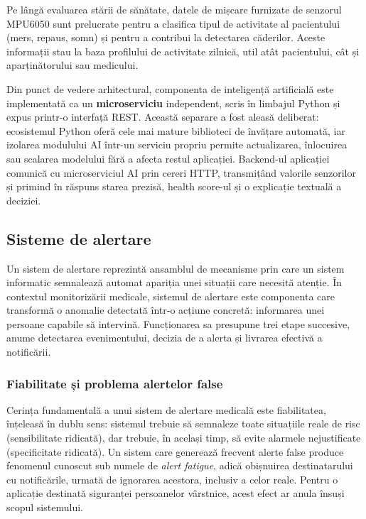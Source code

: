 \documentclass[12pt,a4paper]{article}
\begin{document}
Pe lângă evaluarea stării de sănătate, datele de mișcare furnizate de senzorul MPU6050 sunt prelucrate pentru a clasifica tipul de activitate al pacientului (mers, repaus, somn) și pentru a contribui la detectarea căderilor. Aceste informații stau la baza profilului de activitate zilnică, util atât pacientului, cât și aparținătorului sau medicului.

Din punct de vedere arhitectural, componenta de inteligență artificială este implementată ca un \textbf{microserviciu} independent, scris în limbajul Python și expus printr-o interfață REST. Această separare a fost aleasă deliberat: ecosistemul Python oferă cele mai mature biblioteci de învățare automată, iar izolarea modulului AI într-un serviciu propriu permite actualizarea, înlocuirea sau scalarea modelului fără a afecta restul aplicației. Backend-ul aplicației comunică cu microserviciul AI prin cereri HTTP, transmițând valorile senzorilor și primind în răspuns starea prezisă, health score-ul și o explicație textuală a deciziei.

\subsection{Sisteme de alertare}

Un sistem de alertare reprezintă ansamblul de mecanisme prin care un sistem informatic semnalează automat apariția unei situații care necesită atenție. În contextul monitorizării medicale, sistemul de alertare este componenta care transformă o anomalie detectată într-o acțiune concretă: informarea unei persoane capabile să intervină. Funcționarea sa presupune trei etape succesive, anume detectarea evenimentului, decizia de a alerta și livrarea efectivă a notificării.

\subsubsection{Fiabilitate și problema alertelor false}

Cerința fundamentală a unui sistem de alertare medicală este fiabilitatea, înțeleasă în dublu sens: sistemul trebuie să semnaleze toate situațiile reale de risc (sensibilitate ridicată), dar trebuie, în același timp, să evite alarmele nejustificate (specificitate ridicată). Un sistem care generează frecvent alerte false produce fenomenul cunoscut sub numele de \textit{alert fatigue}, adică obișnuirea destinatarului cu notificările, urmată de ignorarea acestora, inclusiv a celor reale. Pentru o aplicație destinată siguranței persoanelor vârstnice, acest efect ar anula însuși scopul sistemului.
\end{document}
